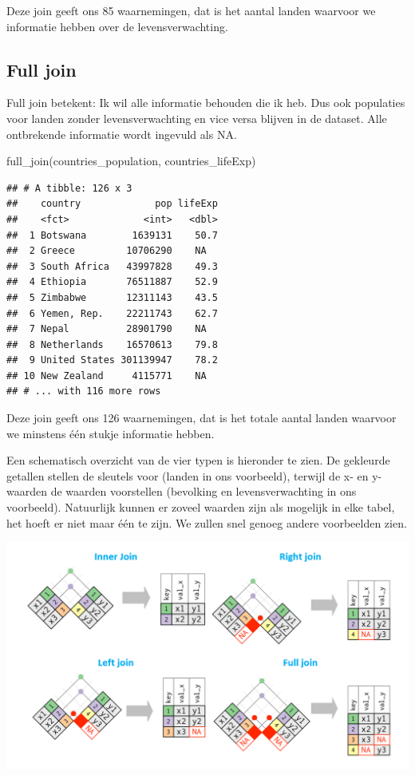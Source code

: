 \documentclass[]{tufte-book}
\newenvironment{Shaded}{}{}
\newcommand{\FunctionTok}[1]{\textcolor[rgb]{0.02,0.16,0.49}{#1}}
\newcommand{\NormalTok}[1]{#1}
\begin{document}
Deze join geeft ons 85 waarnemingen, dat is het aantal landen waarvoor we informatie hebben over de levensverwachting.

\hypertarget{full-join}{%
\subsection{Full join}\label{full-join}}

Full join betekent: Ik wil alle informatie behouden die ik heb. Dus ook populaties voor landen zonder levensverwachting en vice versa blijven in de dataset. Alle ontbrekende informatie wordt ingevuld als NA.

\begin{Shaded}
\begin{Highlighting}[]
\FunctionTok{full\_join}\NormalTok{(countries\_population, countries\_lifeExp)}
\end{Highlighting}
\end{Shaded}

\begin{verbatim}
## # A tibble: 126 x 3
##    country             pop lifeExp
##    <fct>             <int>   <dbl>
##  1 Botswana        1639131    50.7
##  2 Greece         10706290    NA  
##  3 South Africa   43997828    49.3
##  4 Ethiopia       76511887    52.9
##  5 Zimbabwe       12311143    43.5
##  6 Yemen, Rep.    22211743    62.7
##  7 Nepal          28901790    NA  
##  8 Netherlands    16570613    79.8
##  9 United States 301139947    78.2
## 10 New Zealand     4115771    NA  
## # ... with 116 more rows
\end{verbatim}

Deze join geeft ons 126 waarnemingen, dat is het totale aantal landen waarvoor we minstens één stukje informatie hebben.

Een schematisch overzicht van de vier typen is hieronder te zien. De gekleurde getallen stellen de sleutels voor (landen in ons voorbeeld), terwijl de x- en y-waarden de waarden voorstellen (bevolking en levensverwachting in ons voorbeeld). Natuurlijk kunnen er zoveel waarden zijn als mogelijk in elke tabel, het hoeft er niet maar één te zijn. We zullen snel genoeg andere voorbeelden zien.

\includegraphics[width=1\linewidth]{images/join_types}
\end{document}
